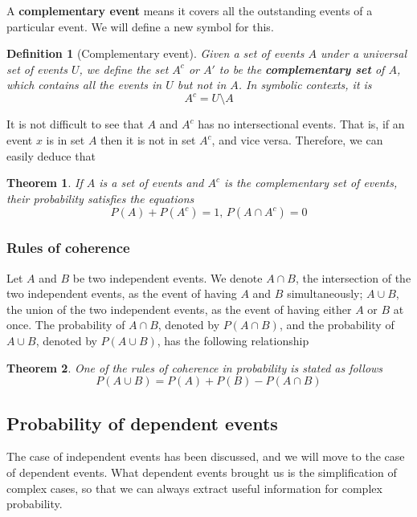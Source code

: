 \documentclass[12pt]{article}
\newtheorem{definition}{Definition}[section]
\newtheorem*{theorem}{Theorem}
\begin{document}
    A \textbf{complementary event} means it covers all the outstanding events of a particular event. We will define a new symbol for this.

    \begin{definition}[Complementary event]
        Given a set of events $A$ under a universal set of events $U$, we define the set $A^c$ or $A'$ to be the \textbf{complementary set} of $A$, which contains all the events in $U$ but not in $A$. In symbolic contexts, it is \[A^c = U\setminus A\]
    \end{definition}

    It is not difficult to see that $A$ and $A^c$ has no intersectional events. That is, if an event $x$ is in set $A$ then it is not in set $A^c$, and vice versa. Therefore, we can easily deduce that

    \begin{theorem}
        If $A$ is a set of events and $A^c$ is the complementary set of events, their probability satisfies the equations \[P(A)+P(A^c)=1,\, P(A\cap A^c)=0\]
    \end{theorem}

    \subsubsection*{Rules of coherence}

    Let $A$ and $B$ be two independent events. We denote $A\cap B$, the intersection of the two independent events, as the event of having $A$ and $B$ simultaneously; $A\cup B$, the union of the two independent events, as the event of having either $A$ or $B$ at once. The probability of $A\cap B$, denoted by $P(A\cap B)$, and the probability of $A\cup B$, denoted by $P(A\cup B)$, has the following relationship

    \begin{theorem}
        One of the rules of coherence in probability is stated as follows \[P(A\cup B)=P(A)+P(B)-P(A\cap B)\] 
    \end{theorem}

    \subsection{Probability of dependent events}

    The case of independent events has been discussed, and we will move to the case of dependent events. What dependent events brought us is the simplification of complex cases, so that we can always extract useful information for complex probability.
\end{document}
